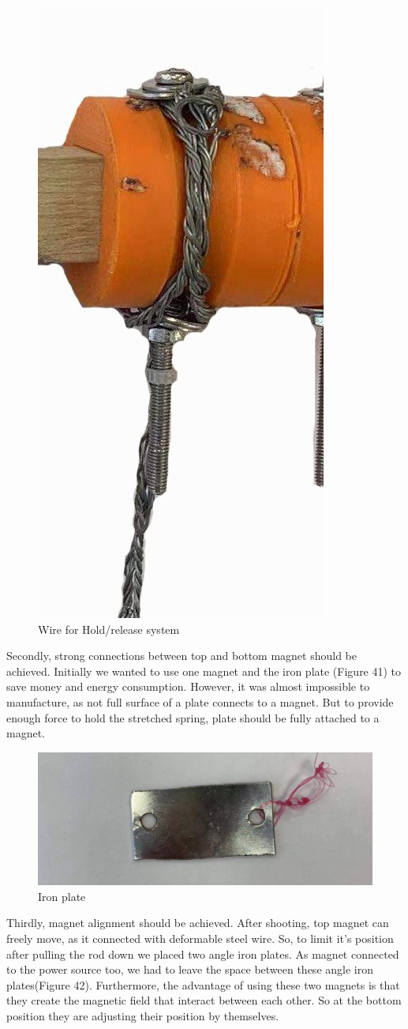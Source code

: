 \documentclass{article}
\begin{document}
\begin{figure}[H]
\centering
\includegraphics[width=0.2\linewidth]{711}
\caption{Wire for Hold/release system}
\end{figure}

\par 

Secondly, strong connections between top and bottom magnet should be achieved. Initially we wanted to use one magnet and the iron plate (Figure 41) to save money and energy consumption. However, it was almost impossible to manufacture, as not full surface of a plate connects to a magnet. But to provide enough force to hold the stretched spring, plate should be fully attached to a magnet. 
\begin{figure}[H]
\centering
\includegraphics[width=0.4\linewidth]{54}
\caption{Iron plate}
\end{figure}

\par 
Thirdly, magnet alignment should be achieved. After shooting, top magnet can freely move, as it connected with deformable steel wire. So, to limit it's position after pulling the rod down we placed two angle iron plates. As magnet connected to the power source too, we had to leave the space between these angle iron plates(Figure 42). Furthermore, the advantage of using these two magnets is that they create the magnetic field that interact between each other. So at the bottom position they are adjusting their position by themselves.
  
\end{document}
